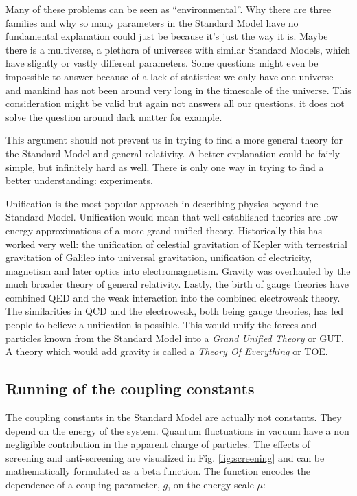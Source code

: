 Many of these problems can be seen as ``environmental''. Why there are three families and why so many parameters in the Standard Model have no fundamental explanation could just be because it's just the way it is. Maybe there is a multiverse, a plethora of universes with similar Standard Models, which have slightly or vastly different parameters. Some questions might even be impossible to answer because of a lack of statistics: we only have one universe and mankind has not been around very long in the timescale of the universe. This consideration might be valid but again not answers all our questions, it does not solve the question around dark matter for example.

This argument should not prevent us in trying to find a more general theory for the Standard Model and general relativity. A better explanation could be fairly simple, but infinitely hard as well. There is only one way in trying to find a better understanding: experiments.

Unification is the most popular approach in describing physics beyond the Standard Model. Unification would mean that well established theories are low-energy approximations of a more grand unified theory. Historically this has worked very well: the unification of celestial gravitation of Kepler with terrestrial gravitation of Galileo into universal gravitation, unification of electricity, magnetism and later optics into electromagnetism. Gravity was overhauled by the much broader theory of general relativity. Lastly, the birth of gauge theories have combined QED and the weak interaction into the combined electroweak theory. The similarities in QCD and the electroweak, both being gauge theories, has led people to believe a unification is possible. This would unify the forces and particles known from the Standard Model into a \textit{Grand Unified Theory} or GUT. A theory which would add gravity is called a \textit{Theory Of Everything} or TOE.


\subsection{Running of the coupling constants}
\label{subsec:running}
The coupling constants in the Standard Model are actually not constants. They depend on the energy of the system. Quantum fluctuations in vacuum have a non negligible contribution in the apparent charge of particles. The effects of screening and anti-screening are visualized in Fig. \ref{fig:screening} and can be mathematically formulated as a beta function. The function encodes the dependence of a coupling parameter, $g$, on the energy scale $\mu$:


